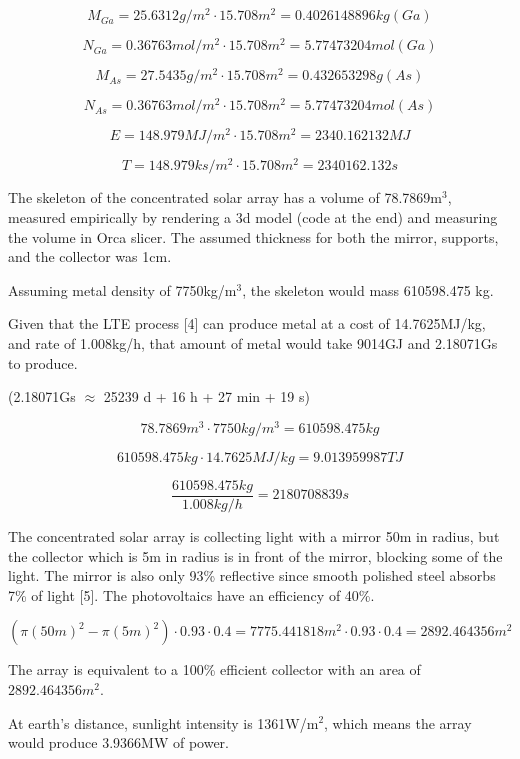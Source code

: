 \documentclass[a4paper]{article}
\begin{document}
	$$ M_{Ga} = 25.6312g/m^2 \cdot 15.708m^2 = 0.4026148896 kg (Ga) $$
	
	$$ N_{Ga} = 0.36763mol/m^2 \cdot 15.708m^2 = 5.77473204 mol (Ga) $$
	
	$$ M_{As} = 27.5435g/m^2 \cdot 15.708m^2 = 0.432653298 g (As) $$
	
	$$ N_{As} = 0.36763mol/m^2 \cdot 15.708m^2 = 5.77473204 mol (As) $$
	
	$$ E = 148.979MJ/m^2 \cdot 15.708m^2 = 2340.162132 MJ $$
	
	$$ T = 148.979ks/m^2 \cdot 15.708m^2 = 2340162.132 s$$
	
	The skeleton of the concentrated solar array has a volume of 78.7869m$^3$, measured empirically by rendering a 3d model (code at the end) and measuring the volume in Orca slicer.
	The assumed thickness for both the mirror, supports, and the collector was 1cm.
	
	\medskip
	
	Assuming metal density of 7750kg/m$^3$, the skeleton would mass 610598.475 kg.
	
	\medskip
	
	Given that the LTE process [4] can produce metal at a cost of 14.7625MJ/kg, and rate of 1.008kg/h, that amount of metal would take 9014GJ and 2.18071Gs to produce.
	
	(2.18071Gs $\approx$ 25239 d + 16 h + 27 min + 19 s)
	
	$$ 78.7869m^3 \cdot 7750kg/m^3 = 610598.475 kg $$
	
	$$ 610598.475 kg \cdot 14.7625MJ/kg = 9.013959987 TJ $$
	
	$$ \frac{610598.475 kg}{1.008kg/h} = 2180708839 s $$
	
	\pagebreak
	
	The concentrated solar array is collecting light with a mirror 50m in radius, but the collector which is 5m in radius is in front of the mirror, blocking some of the light.
	The mirror is also only 93\% reflective since smooth polished steel absorbs 7\% of light [5].
	The photovoltaics have an efficiency of 40\%.
	
	$$ (\pi (50m)^2 - \pi (5m)^2) \cdot 0.93 \cdot 0.4 = 7775.441818 m^2 \cdot 0.93 \cdot 0.4 = 2892.464356 m^2 $$
	
	The array is equivalent to a 100\% efficient collector with an area of $2892.464356 m^2$.
	
	\bigskip
	
	At earth's distance, sunlight intensity is 1361W/m$^2$, which means the array would produce 3.9366MW of power.
	
\end{document}
